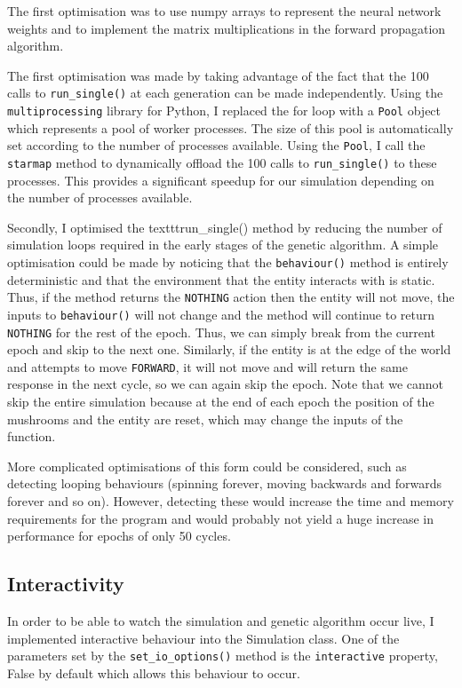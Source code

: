 \documentclass[12pt,a4paper,twoside,openright]{report}
\begin{document}
The first optimisation was to use numpy arrays to represent the neural network weights and to implement the matrix multiplications in the forward propagation algorithm. 

The first optimisation was made by taking advantage of the fact that the 100 calls to \texttt{run\_single()} at each generation can be made independently. Using the \texttt{multiprocessing} library for Python, I replaced the for loop with a \texttt{Pool} object which represents a pool of worker processes. The size of this pool is automatically set according to the number of processes available. Using the \texttt{Pool}, I call the \texttt{starmap} method to dynamically offload the 100 calls to \texttt{run\_single()} to these processes. This provides a significant speedup for our simulation depending on the number of processes available. 

Secondly, I optimised the texttt{run\_single()} method by reducing the number of simulation loops required in the early stages of the genetic algorithm. A simple optimisation could be made by noticing that the \texttt{behaviour()} method is entirely deterministic and that the environment that the entity interacts with is static. Thus, if the method returns the \texttt{NOTHING} action then the entity will not move, the inputs to \texttt{behaviour()} will not change and the method will continue to return \texttt{NOTHING} for the rest of the epoch. Thus, we can simply break from the current epoch and skip to the next one. Similarly, if the entity is at the edge of the world and attempts to move \texttt{FORWARD}, it will not move and will return the same response in the next cycle, so we can again skip the epoch. Note that we cannot skip the entire simulation because at the end of each epoch the position of the mushrooms and the entity are reset, which may change the inputs of the function.

More complicated optimisations of this form could be considered, such as detecting looping behaviours (spinning forever, moving backwards and forwards forever and so on). However, detecting these would increase the time and memory requirements for the program and would probably not yield a huge increase in performance for epochs of only 50 cycles.

\subsection{Interactivity}\label{section:interactivity}

In order to be able to watch the simulation and genetic algorithm occur live, I implemented interactive behaviour into the Simulation class. One of the parameters set by the \texttt{set\_io\_options()} method is the \texttt{interactive} property, False by default which allows this behaviour to occur.
\end{document}
